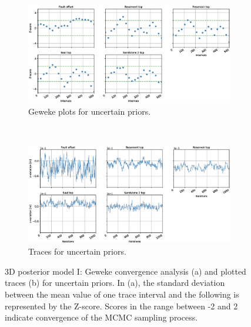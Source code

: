 \documentclass[a4paper,11pt]{MScThesis}
\begin{document}
	\begin{figure}[h]
		\begin{subfigure}{1\textwidth}
			\centering
			\includegraphics[width=1\linewidth]{Figures/Appendix/ML1/Geweke_ML1.eps}
			\caption{Geweke plots for uncertain priors.}
		\end{subfigure}%
		\\
		\begin{subfigure}{1\textwidth}
			\centering
			\includegraphics[width=1\linewidth]{Figures/Appendix/ML1/Traces_ML1.eps}
			\caption{Traces for uncertain priors.}
		\end{subfigure}
		\caption{3D posterior model I: Geweke convergence analysis (a) and plotted traces (b) for uncertain priors. In (a), the standard deviation between the mean value of one trace interval and the following is represented by the Z-score. Scores in the range between -2 and 2 indicate convergence of the MCMC sampling process.}
		\label{fig:gew_ML1}
	\end{figure}
\end{document}
